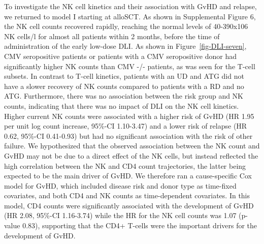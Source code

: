 \documentclass[
  letterpaper,
  DIV=11,
  numbers=noendperiod]{scrreprt}
\begin{document}
To investigate the NK cell kinetics and their association with GvHD and
relapse, we returned to model I starting at alloSCT. As shown in
Supplemental Figure 6, the NK cell counts recovered rapidly, reaching
the normal levels of 40-390x106 NK cells/l for almost all patients
within 2 months, before the time of administration of the early low-dose
DLI. As shown in Figure~\ref{fig-DLI-seven}, CMV seropositive patients
or patients with a CMV seropositive donor had significantly higher NK
counts than CMV -/- patients, as was seen for the T-cell subsets. In
contrast to T-cell kinetics, patients with an UD and ATG did not have a
slower recovery of NK counts compared to patients with a RD and no ATG.
Furthermore, there was no association between the risk group and NK
counts, indicating that there was no impact of DLI on the NK cell
kinetics. Higher current NK counts were associated with a higher risk of
GvHD (HR 1.95 per unit log count increase, 95\%-CI 1.10-3.47) and a
lower risk of relapse (HR 0.62, 95\%-CI 0.41-0.93) but had no
significant association with the risk of other failure. We hypothesized
that the observed association between the NK count and GvHD may not be
due to a direct effect of the NK cells, but instead reflected the high
correlation between the NK and CD4 count trajectories, the latter being
expected to be the main driver of GvHD. We therefore ran a
cause-specific Cox model for GvHD, which included disease risk and donor
type as time-fixed covariates, and both CD4 and NK counts as
time-dependent covariates. In this model, CD4 counts were significantly
associated with the development of GvHD (HR 2.08, 95\%-CI 1.16-3.74)
while the HR for the NK cell counts was 1.07 (p-value 0.83), supporting
that the CD4+ T-cells were the important drivers for the development of
GvHD.
\end{document}
